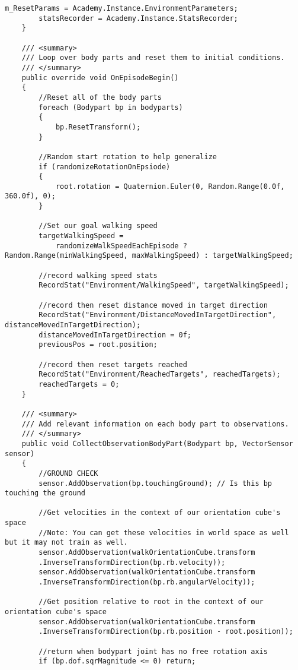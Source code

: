 \begin{lstlisting}[caption={Agenten Skript},captionpos=b,label={lst:skript_agent1}]
        m_ResetParams = Academy.Instance.EnvironmentParameters;
        statsRecorder = Academy.Instance.StatsRecorder;
    }

    /// <summary>
    /// Loop over body parts and reset them to initial conditions.
    /// </summary>
    public override void OnEpisodeBegin()
    {
        //Reset all of the body parts
        foreach (Bodypart bp in bodyparts)
        {
            bp.ResetTransform();
        }

        //Random start rotation to help generalize
        if (randomizeRotationOnEpsiode)
        {
            root.rotation = Quaternion.Euler(0, Random.Range(0.0f, 360.0f), 0);
        }

        //Set our goal walking speed
        targetWalkingSpeed =
            randomizeWalkSpeedEachEpisode ? Random.Range(minWalkingSpeed, maxWalkingSpeed) : targetWalkingSpeed;

        //record walking speed stats
        RecordStat("Environment/WalkingSpeed", targetWalkingSpeed);

        //record then reset distance moved in target direction
        RecordStat("Environment/DistanceMovedInTargetDirection", distanceMovedInTargetDirection);
        distanceMovedInTargetDirection = 0f;
        previousPos = root.position;

        //record then reset targets reached
        RecordStat("Environment/ReachedTargets", reachedTargets);
        reachedTargets = 0;
    }

    /// <summary>
    /// Add relevant information on each body part to observations.
    /// </summary>
    public void CollectObservationBodyPart(Bodypart bp, VectorSensor sensor)
    {
        //GROUND CHECK
        sensor.AddObservation(bp.touchingGround); // Is this bp touching the ground

        //Get velocities in the context of our orientation cube's space
        //Note: You can get these velocities in world space as well but it may not train as well.
        sensor.AddObservation(walkOrientationCube.transform
        .InverseTransformDirection(bp.rb.velocity));
        sensor.AddObservation(walkOrientationCube.transform
        .InverseTransformDirection(bp.rb.angularVelocity));

        //Get position relative to root in the context of our orientation cube's space
        sensor.AddObservation(walkOrientationCube.transform
        .InverseTransformDirection(bp.rb.position - root.position));

        //return when bodypart joint has no free rotation axis
        if (bp.dof.sqrMagnitude <= 0) return;


\end{lstlisting}
